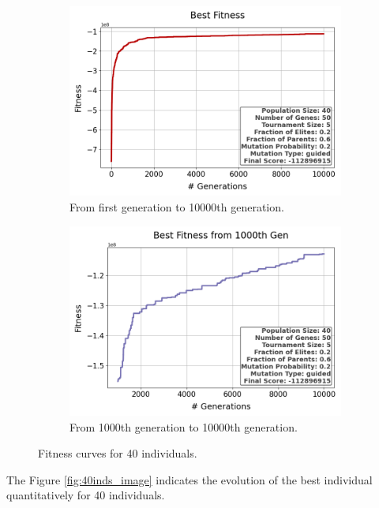 \documentclass{assignment}
\begin{document}
\begin{figure}[H]
    \begin{subfigure}{0.5\textwidth}
        \includegraphics[width=\textwidth]{figures/best_fitness_output_40_50_5_0.2_0.6_0.2_guided.png}
        \caption{From first generation to 10000th generation.}
    \end{subfigure}\hfill
    \begin{subfigure}{0.5\textwidth}
        \includegraphics[width=\textwidth]{figures/best_fitness_1000_output_40_50_5_0.2_0.6_0.2_guided.png}
        \caption{From 1000th generation to 10000th generation.}
    \end{subfigure}
    \caption{Fitness curves for 40 individuals.}
\label{fig:40inds}
\end{figure}

The Figure \ref{fig:40inds_image} indicates the evolution of the best individual quantitatively for 40 individuals.
\end{document}

